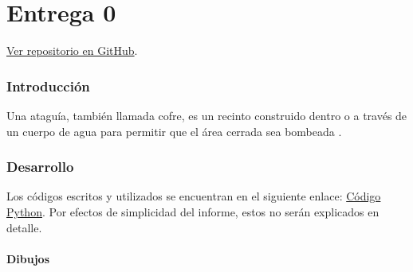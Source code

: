 \part{Entrega 0}
\begin{center}
  \href{https://github.com/LukasWolff2002/PROYECTO_1_MCOCo}{Ver repositorio en GitHub}.
\end{center}

\section{Introducción}

Una ataguía, también llamada cofre, es un recinto construido dentro o a través de un cuerpo de agua para permitir que el área cerrada sea bombeada \textbf{\citet{acerlum2023}}.

\section{Desarrollo}

Los códigos escritos y utilizados se encuentran en el siguiente enlace: \href{https://github.com/LukasWolff2002/PROYECTO_1_MCOC/tree/main/CODIGO}{Código Python}. Por efectos de simplicidad del informe, estos no serán explicados en detalle.

\subsection{Dibujos}

